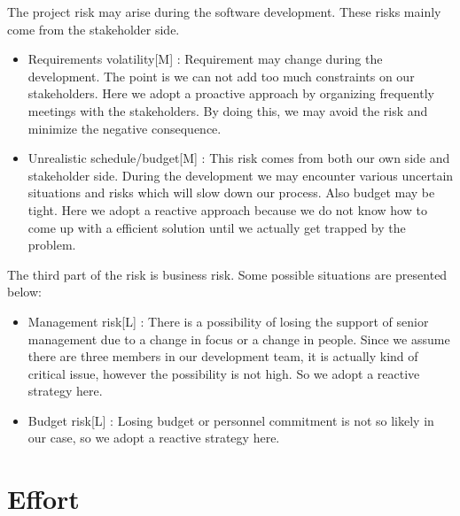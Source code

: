 \documentclass{article}
\begin{document}
The project risk may arise during the software development. These risks mainly come from the stakeholder side.
\begin{itemize}
	\item Requirements volatility[M] : Requirement may change during the development. The point is we can not add too much constraints on our stakeholders. Here we adopt a proactive approach by organizing frequently meetings with the stakeholders. By doing this, we may avoid the risk and  minimize the negative consequence.
	\item Unrealistic schedule/budget[M] : This risk comes from both our own side and stakeholder side. During the development we may encounter various uncertain situations and risks which will slow down our process. Also budget may be tight. Here we adopt a reactive approach because we do not know how to come up with a efficient solution until we actually get trapped by the problem.
\end{itemize}
The third part of the risk is business risk. Some possible situations are presented below:
\begin{itemize}
	\item Management risk[L] : There is a possibility of losing the support of senior management due to a change in focus or a change in people. Since we assume there are three members in our development team, it is actually kind of critical issue, however the possibility is not high. So we adopt a reactive strategy here.
	\item Budget risk[L] : Losing budget or personnel commitment is not so likely in our case, so we adopt a reactive strategy here.
\end{itemize}


\newpage

\section{Effort}
\end{document}
